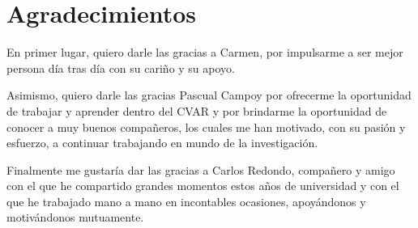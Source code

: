 
\chapter*{Agradecimientos}

En primer lugar, quiero darle las gracias a Carmen, por impulsarme a ser mejor persona día tras día con su cariño y su apoyo.

Asimismo, quiero darle las gracias Pascual Campoy por ofrecerme la oportunidad de trabajar y aprender dentro del CVAR y por brindarme la oportunidad de conocer a muy buenos compañeros, los cuales me han motivado, con su pasión y esfuerzo, a continuar trabajando en mundo de la investigación.

Finalmente me gustaría dar las gracias a Carlos Redondo, compañero y amigo con el que he compartido grandes momentos estos años de universidad y con el que he trabajado mano a mano en incontables ocasiones, apoyándonos y motivándonos mutuamente. 





